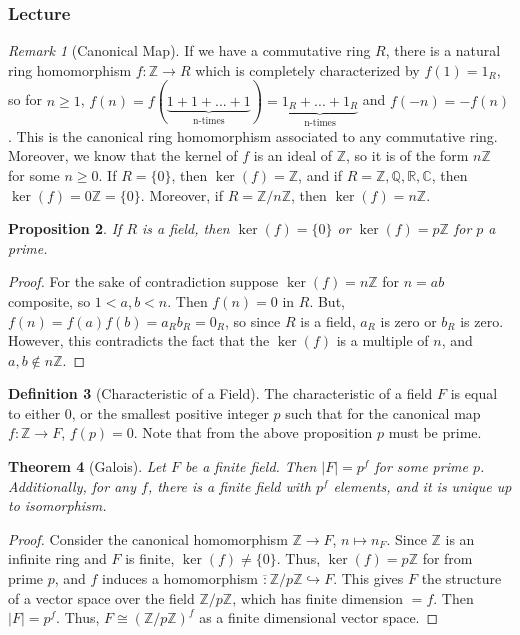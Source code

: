 \documentclass[12pt]{article}
\newtheorem{thm}{Theorem}[section]
\newtheorem{prop}[thm]{Proposition}
\theoremstyle{definition}
\newtheorem{defn}[thm]{Definition}
\theoremstyle{remark}
\newtheorem{rmk}[thm]{Remark}
\numberwithin{equation}{section}
\newcommand\C{\mathbb C}    %
\newcommand\R{\mathbb R}    %
\newcommand\Z{\mathbb Z}    %
\newcommand\Q{\mathbb Q}    %
\begin{document}
\subsubsection{Lecture}

\begin{rmk}[Canonical Map]
        If we have a commutative ring $R$, there is a natural ring homomorphism $f:\Z\rightarrow R$ which is completely characterized by $f(1) = 1_R$, so for $n \geq 1$, $f(n) = f(\underbrace{1+1+...+1}_{\text{n-times}}) = \underbrace{1_R+...+1_R}_{\text{n-times}}$ and $f(-n) = -f(n)$. This is the canonical ring homomorphism associated to any commutative ring. Moreover, we know that the kernel of $f$ is an ideal of $\Z$, so it is of the form $n\Z$ for some $n \geq 0$. If $R = \{0\}$, then $\ker(f) =\Z$, and if $R = \Z,\Q,\R,\C$, then $\ker(f) = 0\Z = \{0\}$. Moreover, if $R= \Z/n\Z$, then $\ker(f) = n\Z$.
\end{rmk}

\vspace{15pt}

\begin{prop}
        If $R$ is a field, then $\ker(f) = \{0\}$ or $\ker(f) = p\Z$ for $p$ a prime.
\end{prop}
\begin{proof}
        For the sake of contradiction suppose $\ker(f) = n\Z$ for $n = ab$ composite, so $1 < a,b < n$. Then $f(n) = 0$ in $R$. But, $f(n) = f(a)f(b) = a_Rb_R = 0_R$, so since $R$ is a field, $a_R$ is zero or $b_R$ is zero. However, this contradicts the fact that the $\ker(f)$ is a multiple of $n$, and $a,b \notin n\Z$.
\end{proof}

\vspace{15pt}

\begin{defn}[Characteristic of a Field]
        The characteristic of a field $F$ is equal to either $0$, or the smallest positive integer $p$ such that for the canonical map $f:\Z\rightarrow F$, $f(p) = 0$. Note that from the above proposition $p$ must be prime.
\end{defn}


\vspace{15pt}


\begin{thm}[Galois]
        Let $F$ be a finite field. Then $|F| = p^f$ for some prime $p$. Additionally, for any $f$, there is a finite field with $p^f$ elements, and it is unique up to isomorphism.
\end{thm}
\begin{proof}
        Consider the canonical homomorphism $\Z\rightarrow F$, $n\mapsto n_F$. Since $\Z$ is an infinite ring and $F$ is finite, $\ker(f) \neq \{0\}$. Thus, $\ker(f) = p\Z$ for from prime $p$, and $f$ induces a homomorphism $\overline:\Z/p\Z\hookrightarrow F$. This gives $F$ the structure of a vector space over the field $\Z/p\Z$, which has finite dimension $= f$. Then $|F| = p^f$. Thus, $F \cong (\Z/p\Z)^f$ as a finite dimensional vector space.
\end{proof}
\end{document}
